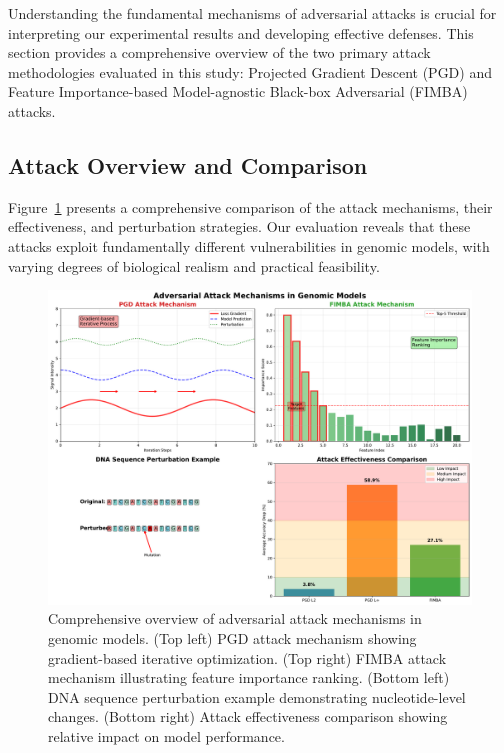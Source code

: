 \documentclass{article} %
\begin{document}
Understanding the fundamental mechanisms of adversarial attacks is crucial for interpreting our experimental results and developing effective defenses. This section provides a comprehensive overview of the two primary attack methodologies evaluated in this study: Projected Gradient Descent (PGD) and Feature Importance-based Model-agnostic Black-box Adversarial (FIMBA) attacks.

\subsection{Attack Overview and Comparison}

Figure~\ref{fig:attack_overview} presents a comprehensive comparison of the attack mechanisms, their effectiveness, and perturbation strategies. Our evaluation reveals that these attacks exploit fundamentally different vulnerabilities in genomic models, with varying degrees of biological realism and practical feasibility.

\begin{figure}[h]
\centering
\includegraphics[width=\textwidth]{figures/attack_overview_diagram.pdf}
\caption{Comprehensive overview of adversarial attack mechanisms in genomic models. (Top left) PGD attack mechanism showing gradient-based iterative optimization. (Top right) FIMBA attack mechanism illustrating feature importance ranking. (Bottom left) DNA sequence perturbation example demonstrating nucleotide-level changes. (Bottom right) Attack effectiveness comparison showing relative impact on model performance.}
\label{fig:attack_overview}
\end{figure}
\end{document}
